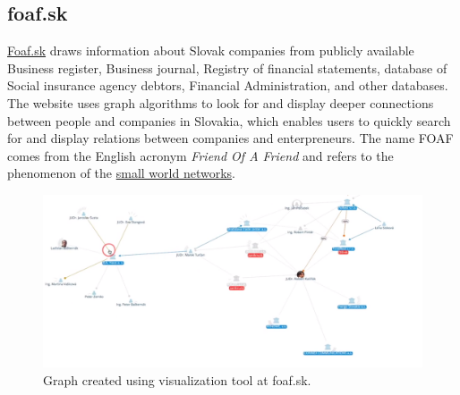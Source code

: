 \documentclass[thesis=B,english]{FITthesis}[2012/06/26]
\begin{document}
	\subsection{foaf.sk}
	\href{http://foaf.sk}{Foaf.sk} draws information about Slovak companies from publicly available Business register, Business journal, Registry of financial statements, database of Social insurance agency debtors, Financial Administration, and other databases. The website uses graph algorithms to look for and display deeper connections between people and companies in Slovakia, which enables users to quickly search for and display relations between companies and enterpreneurs. The name FOAF comes from the English acronym \textit{Friend Of A Friend} and refers to the phenomenon of the \href{http://www.scholarpedia.org/article/Small-world_network}{small world networks}.
\begin{figure}[h!]
  \includegraphics[width=\linewidth]{pictures/foafskgraph.png}
  \caption{Graph created using visualization tool at foaf.sk.}
  \label{fig:foafGraph}
\end{figure}
	
\end{document}
